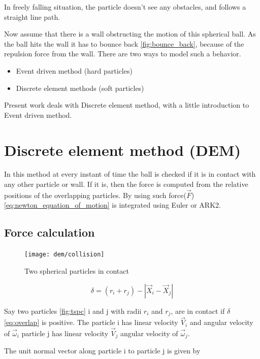 In freely falling situation, the particle doesn't see any obstacles,
and follows a straight line path.

Now assume that there is a wall obstructing the motion of this
spherical ball.  As the ball hits the wall it has to bounce back
\eqref{fig:bounce_back}, because of the repulsion force from the
wall. There are two ways to model such a behavior.

\begin{itemize}
\item Event driven method (hard particles)
\item Discrete element methods (soft particles)
\end{itemize}


Present work deals with Discrete element method, with a little introduction
to Event driven method.

\section{Discrete element method (DEM)}
\label{sec:edm}

In this method at every instant of time the ball is checked if it is
in contact with any other particle or wall. If it is, then the force
is computed from the relative positions of the overlapping
particles. By using such force($\vec{F}$) \eqref{eq:newton_equation_of_motion} is
integrated using Euler or ARK2.

\subsection{Force calculation}
\label{sec:force}

\begin{figure}
  \centering
  \texttt{[image: dem/collision]}
  \caption{Two spherical particles in contact}
  \label{fig:tspc}
\end{figure}

\begin{equation}
  \label{eq:overlap}
  \delta = (r_i + r_j) - |\vec{X}_{i} - \vec{X}_{j}|
\end{equation}

Say two particles \eqref{fig:tspc} i and j with radii $r_{i}$ and
$r_{j}$, are in contact if $\delta$ \eqref{eq:overlap} is positive.
The particle i has linear velocity $\vec{V}_{i}$ and angular velocity
of $\vec{\omega}_{i}$ particle j has linear velocity $\vec{V}_{j}$ angular
velocity of $\vec{\omega}_{j}$.

The unit normal vector along particle i to particle j  is given by

